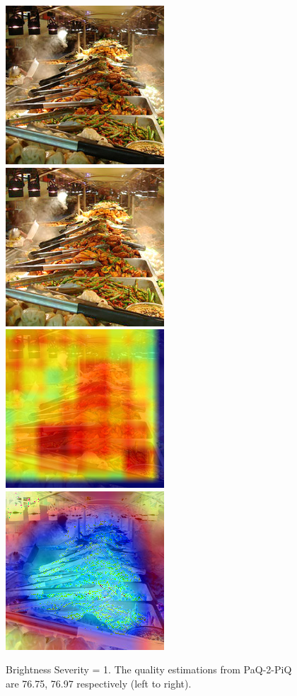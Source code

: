 \documentclass[10pt,twocolumn,letterpaper]{article}
\begin{document}
\begin{figure}[!ht]
	\includegraphics[width=.49\columnwidth]{Images/test_images/severity=0/buffet.png}\hfill
	\includegraphics[width=.49\columnwidth]{Images/test_images/severity=1/brightness/buffet.png}\hfill
	\\[\smallskipamount]
    \includegraphics[width=.49\columnwidth]{Images/saliency_maps/paq2piq/severity=1/brightness/buffet.png}\hfill
	\includegraphics[width=.49\columnwidth]{Images/saliency_maps/resnet18/severity=1/brightness/buffet.png}\hfill
    \caption{Brightness Severity = 1. The quality estimations from PaQ-2-PiQ are 76.75, 76.97 respectively (left to right).}
\end{figure}
\end{document}
